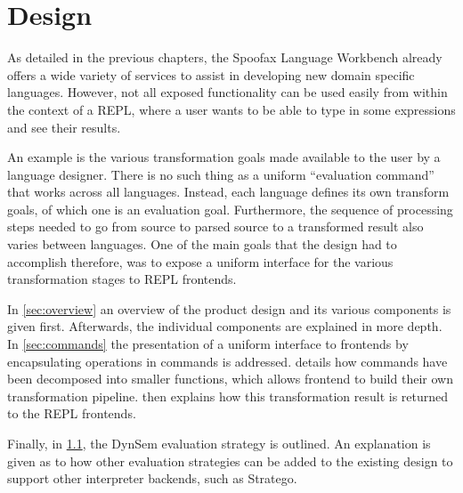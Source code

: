 \chapter{Design}
\label{cha:design}

As detailed in the previous chapters, the Spoofax Language Workbench already
offers a wide variety of services to assist in developing new domain specific
languages. However, not all exposed functionality can be used easily from within
the context of a REPL, where a user wants to be able to type in some expressions
and see their results.

An example is the various transformation goals made available to the user by a
language designer. There is no such thing as a uniform ``evaluation command''
that works across all languages. Instead, each language defines its own
transform goals, of which one is an evaluation goal.  Furthermore, the sequence
of processing steps needed to go from source to parsed source to a transformed
result also varies between languages. One of the main goals that the design had to
accomplish therefore, was to expose a uniform interface for the various
transformation stages to REPL frontends.

In \cref{sec:overview} an overview of the product design and its various
components is given first. Afterwards, the individual components are
explained in more depth. In \cref{sec:commands} the presentation of a uniform
interface to frontends by encapsulating operations in commands is addressed.
 details how commands have been
decomposed into smaller functions, which allows frontend to build their own
transformation pipeline.  then explains how this
transformation result is returned to the REPL frontends.

Finally, in \cref{sec:eval-strat}, the DynSem evaluation strategy is outlined. 
An explanation is given as to how other evaluation strategies
can be added to the existing design to support other interpreter backends,
such as Stratego.









\section{}
\label{sec:eval-strat}


